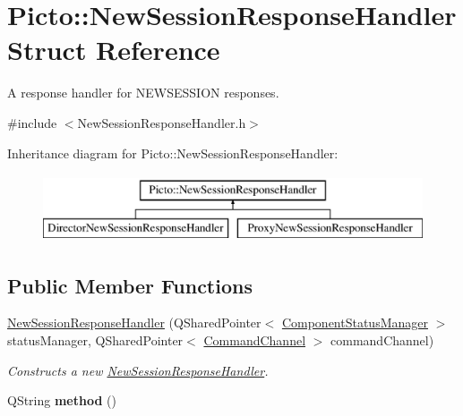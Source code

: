 \hypertarget{struct_picto_1_1_new_session_response_handler}{\section{Picto\-:\-:New\-Session\-Response\-Handler Struct Reference}
\label{struct_picto_1_1_new_session_response_handler}
}


A response handler for N\-E\-W\-S\-E\-S\-S\-I\-O\-N responses.  




{\ttfamily \#include $<$New\-Session\-Response\-Handler.\-h$>$}

Inheritance diagram for Picto\-:\-:New\-Session\-Response\-Handler\-:\begin{figure}[H]
\begin{center}
\leavevmode
\includegraphics[height=2.000000cm]{struct_picto_1_1_new_session_response_handler}
\end{center}
\end{figure}
\subsection*{Public Member Functions}
\begin{DoxyCompactItemize}
\item 
\hyperlink{struct_picto_1_1_new_session_response_handler_a792dae47a379006dc1124e5f59aa05d4}{New\-Session\-Response\-Handler} (Q\-Shared\-Pointer$<$ \hyperlink{class_component_status_manager}{Component\-Status\-Manager} $>$ status\-Manager, Q\-Shared\-Pointer$<$ \hyperlink{class_picto_1_1_command_channel}{Command\-Channel} $>$ command\-Channel)
\begin{DoxyCompactList}\small\item\em Constructs a new \hyperlink{struct_picto_1_1_new_session_response_handler}{New\-Session\-Response\-Handler}. \end{DoxyCompactList}\item 
\hypertarget{struct_picto_1_1_new_session_response_handler_a925d9dc8e2d0a9c3e8c7d06930906643}{Q\-String {\bfseries method} ()}\label{struct_picto_1_1_new_session_response_handler_a925d9dc8e2d0a9c3e8c7d06930906643}

\end{DoxyCompactItemize}
